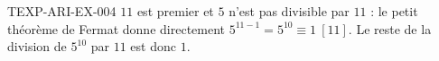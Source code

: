 \begin{corrige}{TEXP-ARI-EX-004}
$11$ est premier et $5$ n'est pas divisible par $11$ : le petit théorème de Fermat donne directement $5^{11-1}=5^{10}\equiv1\ [11]$. Le reste de la division de $5^{10}$ par $11$ est donc $1$.
\end{corrige}
